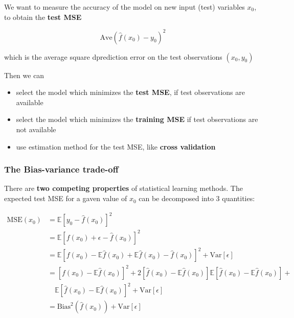\documentclass[11pt]{article}
\begin{document}
We want to measure the accuracy of the model on new input (test) variables $x_0$, to obtain the \textbf{test MSE}

\begin{equation}
    \text{Ave} (\hat{f}(x_0) - y_0)^2
\end{equation}

which is the average square dprediction error on the test observations $(x_0, y_0)$

Then we can
\begin{itemize}
    \item select the model which minimizes the \textbf{test MSE}, if test observations are available
    \item select the model which minimizes the \textbf{training MSE} if test observations are not available
    \item use estimation method for the test MSE, like \textbf{cross validation}
\end{itemize}

\subsubsection{The Bias-variance trade-off}
There are \textbf{two competing properties} of statistical learning methods. The expected test MSE for a gaven value of $x_0$ can be decomposed into 3 quantities:

\begin{align}
    \text{MSE}(x_0) &= \mathbb{E}[y_0 - \hat{f}(x_0)]^2 \nonumber \\
    &= \mathbb{E} [f(x_0) + \epsilon - \hat{f}(x_0)]^2 \nonumber \\
    &= \mathbb{E} \left[ f(x_0) - \mathbb{E}\hat{f}(x_0) + \mathbb{E}\hat{f}(x_0) - \hat{f}(x_0) \right]^2 + \text{Var}[\epsilon] \nonumber \\
    &= \left[ f(x_0) - \mathbb{E}\hat{f}(x_0) \right]^2 + 2 \left[ \hat{f}(x_0) - \mathbb{E}\hat{f}(x_0) \right] \mathbb{E} \left[ \hat{f}(x_0) - \mathbb{E}\hat{f}(x_0) \right] + \nonumber \\
    & \quad \mathbb{E} \left[ \hat{f}(x_0) - \mathbb{E}\hat{f}(x_0) \right]^2 + \text{Var}[\epsilon] \nonumber \\
    &= \text{Bias}^2 \left(\hat{f} (x_0) \right) + \text{Var} [\epsilon]
\end{align}
\end{document}
